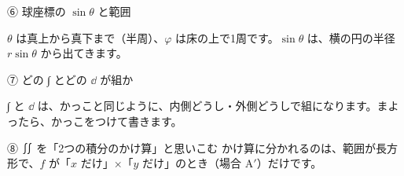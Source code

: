 \begingroup{}%
\noindent\begin{minipage}[t]{0.485\linewidth}\vspace{0pt}
\begin{tsumazuki}{⑥ 球座標の $\sin\theta$ と範囲}
\raggedright{}
$\theta$ は真上から真下まで（半周）、$\varphi$ は床の上で1周です。$\sin\theta$ は、横の円の半径 $r\sin\theta$ から出てきます。
\end{tsumazuki}
\end{minipage}\hfill
\begin{minipage}[t]{0.485\linewidth}\vspace{0pt}
\begin{tsumazuki}{⑦ どの ∫ とどの $\dd$ が組か}
\raggedright{}
∫ と $\dd$ は、かっこと同じように、内側どうし・外側どうしで組になります。まよったら、かっこをつけて書きます。
\end{tsumazuki}
\end{minipage}\par
\endgroup

\begin{tsumazuki}{⑧ ∬ を「2つの積分のかけ算」と思いこむ}
かけ算に分かれるのは、範囲が長方形で、$f$ が「$x$ だけ」×「$y$ だけ」のとき（場合 A$'$）だけです。
\end{tsumazuki}



